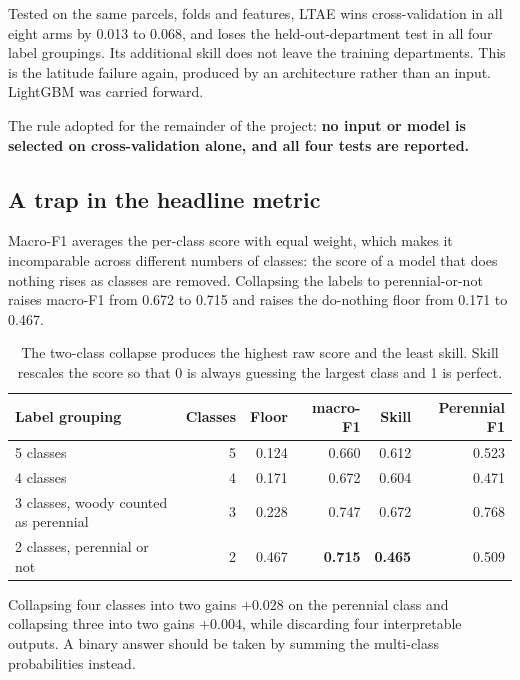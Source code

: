 \documentclass[11pt,a4paper]{article}
\begin{document}
Tested on the same parcels, folds and features, LTAE wins cross-validation in all eight arms by
0.013 to 0.068, and loses the held-out-department test in all four label groupings. Its
additional skill does not leave the training departments. This is the latitude failure again,
produced by an architecture rather than an input. LightGBM was carried forward.

The rule adopted for the remainder of the project: \textbf{no input or model is selected on
cross-validation alone, and all four tests are reported.}

\subsection{A trap in the headline metric}

Macro-F1 averages the per-class score with equal weight, which makes it incomparable across
different numbers of classes: the score of a model that does nothing rises as classes are
removed. Collapsing the labels to perennial-or-not raises macro-F1 from 0.672 to 0.715 and raises
the do-nothing floor from 0.171 to 0.467.

\begin{table}[htbp]
\centering
\small
\caption{The two-class collapse produces the highest raw score and the least skill. Skill
rescales the score so that 0 is always guessing the largest class and 1 is perfect.}
\label{tab:floor}
\begin{tabular}{@{}lrrrrr@{}}
\toprule
\textbf{Label grouping} & \textbf{Classes} & \textbf{Floor} & \textbf{macro-F1} & \textbf{Skill}
& \textbf{Perennial F1} \\
\midrule
5 classes & 5 & 0.124 & 0.660 & 0.612 & 0.523 \\
4 classes & 4 & 0.171 & 0.672 & 0.604 & 0.471 \\
3 classes, woody counted as perennial & 3 & 0.228 & 0.747 & 0.672 & 0.768 \\
\rowcolor{red!7} 2 classes, perennial or not & 2 & 0.467 & \textbf{0.715} & \textbf{0.465} & 0.509 \\
\bottomrule
\end{tabular}
\end{table}

Collapsing four classes into two gains $+0.028$ on the perennial class and collapsing three into
two gains $+0.004$, while discarding four interpretable outputs. A binary answer should be taken
by summing the multi-class probabilities instead.
\end{document}

